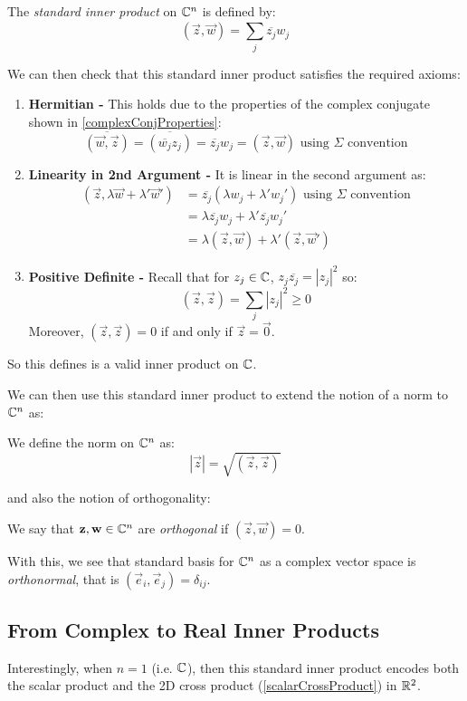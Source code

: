 \documentclass[../main.tex]{subfiles}
\begin{document}
\begin{definition}
  The \textit{standard inner product} on $\mathbb{C}^{n}$ is defined by:
  \[
    (\vec{z}, \vec{w}) = \sum_{j}^{} \overline{z_j} w_j
  \]
\end{definition}
We can then check that this standard inner product satisfies the required axioms:
\begin{enumerate}
  \item \textbf{Hermitian -} This holds due to the properties of the complex conjugate shown in \cref{complexConjProperties}:
    \[
      \overline{(\vec{w}, \vec{z})} = \overline{(\overline{w_j}z_j)} = \overline{z_j}w_j = (\vec{z}, \vec{w}) \text{ using $\Sigma$ convention}
    \]
  \item \textbf{Linearity in 2nd Argument -} It is linear in the second argument as:
    \begin{align*}
      (\vec{z}, \lambda \vec{w} + \lambda' \vec{w}') &= \overline{z_j}(\lambda w_j + \lambda' w_j') \text{ using $\Sigma$ convention} \\
                                                     &= \lambda \overline{z_j}w_j + \lambda' \overline{z_j}w_j' \\
                                                     &= \lambda(\vec{z}, \vec{w}) + \lambda'(\vec{z}, \vec{w}')
    \end{align*}
  \item \textbf{Positive Definite -} Recall that for $z_j \in \mathbb{C}$, $z_j \overline{z_j} = |z_j|^2$ so:
    \[
      (\vec{z}, \vec{z}) = \sum_{j} |z_j|^2 \geq 0
    \]
    Moreover, $(\vec{z}, \vec{z}) = 0$ if and only if $\vec{z} = \vec{0}$.
\end{enumerate}
So this defines is a valid inner product on $\mathbb{C}$.

We can then use this standard inner product to extend the notion of a norm to $\mathbb{C}^{n}$ as:
\begin{definition}[Norm]
  We define the norm on $\mathbb{C}^{n}$ as:
  \[
    |\vec{z}| = \sqrt{(\vec{z}, \vec{z})}
  \]
\end{definition}
and also the notion of orthogonality:
\begin{definition}[Orthogonal]
  We say that $\mathbf{\bm{z}}, \mathbf{\bm{w}} \in \mathbb{C}^{n}$ are \textit{orthogonal} if $(\vec{z}, \vec{w}) = 0$.
\end{definition}
With this, we see that standard basis for $\mathbb{C}^{n}$ as a complex vector space is \textit{orthonormal}, that is $(\vec{e}_i, \vec{e}_j) = \delta_{i j}$.
\subsection{From Complex to Real Inner Products}
Interestingly, when $n = 1$ (i.e. $\mathbb{C}$), then this standard inner product encodes both the scalar product and the 2D cross product (\cref{scalarCrossProduct}) in $\mathbb{R}^2$.
\end{document}
